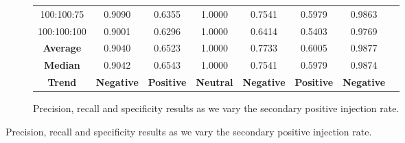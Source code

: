 \begin{figure}[ht]
\begin{subfigure}{\textwidth}
{\begin{tabular}{cccccccc}
                100:100:75                            & 0.9090                                        & 0.6355                                         & 1.0000               & 0.7541             & 0.5979            & 0.9863               \\
                100:100:100                           & 0.9001                                        & 0.6296                                         & 1.0000               & 0.6414             & 0.5403            & 0.9769               \\
                \midrule
                \textbf{Average}                      & 0.9040                                        & 0.6523                                         & 1.0000               & 0.7733             & 0.6005            & 0.9877               \\
                \textbf{Median}                       & 0.9042                                        & 0.6543                                         & 1.0000               & 0.7541             & 0.5979            & 0.9874               \\
                \midrule
                \textbf{Trend}                        & \textbf{Negative}                             & \textbf{Positive}                              & \textbf{Neutral}     & \textbf{Negative}  & \textbf{Positive} & \textbf{Negative}    \\
                \bottomrule
            \end{tabular}%
        }

        \caption{Precision, recall and specificity results as we vary the secondary positive injection rate.}
        \label{subfig:ratio_test_combined_sl}
    \end{subfigure}

    \vspace{5pt}


\end{figure}
